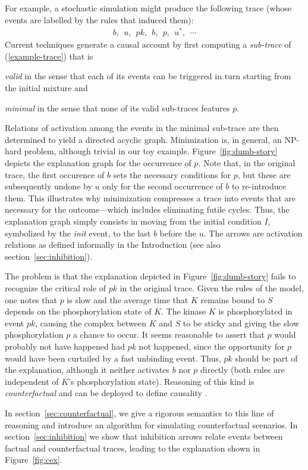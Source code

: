 For example, a stochastic simulation might produce the following trace
(whose events are labelled by the rules that induced them):
\begin{align}
  \label{example-trace} b,\ \ u,\ \ pk,\ \ b,\ \ p,\ \
  u^{*},\ \ \cdots
\end{align} 
Current
techniques \cite{DBLP:conf/fsttcs/DanosFFHH12,DanosEtAl-CONCUR07}
generate a causal account by first computing a \emph{sub-trace} of
(\ref{example-trace}) that is
\begin{inparaenum}[(i)]
\item \emph{valid} in the sense that each of its events can be
  triggered in turn starting from the initial mixture and
\item \emph{minimal} in the sense that none of its valid sub-traces
  features $p$.
\end{inparaenum}
Relations of activation among the events in the minimal sub-trace are
then determined to yield a directed acyclic graph. Minimization is, in
general, an NP-hard problem, although trivial in our toy
example. Figure~\ref{fig:dumb-story} depicts the explanation graph for
the occurrence of $p$. Note that, in the original trace, the first
occurence of $b$ sets the necessary conditions for $p$, but these are
subsequently undone by $u$ only for the second occurrence of $b$ to
re-introduce them. This illustrates why minimization compresses a
trace into events that are necessary for the outcome---which includes
eliminating futile cycles. Thus, the explanation graph simply consists
in moving from the initial condition $I$, symbolized by the
\emph{init} event, to the last $b$ before the $u$. The arrows are
activation relations as defined informally in the Introduction (see
also section~\ref{sec:inhibition}).



The problem is that the explanation depicted in
Figure~\ref{fig:dumb-story} fails to recognize the critical role of
$pk$ in the original trace. Given the rules of the model, one notes
that $p$ is slow and the average time that $K$ remains bound to $S$
depends on the phosphorylation state of $K$. The kinase $K$ is
phosphorylated in event $pk$, causing the complex between $K$ and $S$
to be sticky and giving the slow phosphorylation $p$ a chance to
occur. It seems reasonable to assert that $p$ would probably not have
happened had $pk$ not happened, since the opportunity for $p$ would
have been curtailed by a fast unbinding event. Thus, $pk$ should be
part of the explanation, although it neither activates $b$ nor $p$
directly (both rules are independent of $K$'s phosphorylation
state). Reasoning of this kind is \emph{counterfactual} and can be
deployed to define causality
\cite{lewis1974causation,pearl2009causality}.

In section~\ref{sec:counterfactual}, we give a rigorous semantics to
this line of reasoning and introduce an algorithm for simulating
counterfactual scenarios. In section~\ref{sec:inhibition} we show that
inhibition arrows relate events between factual and counterfactual
traces, leading to the explanation shown in Figure~\ref{fig:cex}.

